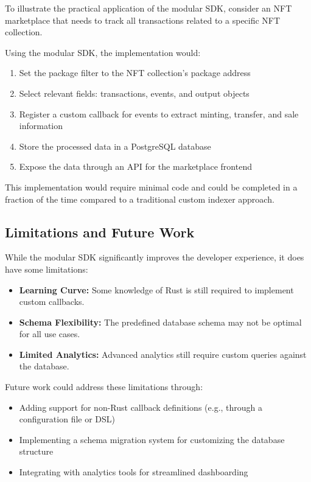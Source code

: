 To illustrate the practical application of the modular SDK, consider an NFT marketplace that needs to track all transactions related to a specific NFT collection.

Using the modular SDK, the implementation would:

\begin{enumerate}
    \item Set the package filter to the NFT collection's package address
    \item Select relevant fields: transactions, events, and output objects
    \item Register a custom callback for events to extract minting, transfer, and sale information
    \item Store the processed data in a PostgreSQL database
    \item Expose the data through an API for the marketplace frontend
\end{enumerate}

This implementation would require minimal code and could be completed in a fraction of the time compared to a traditional custom indexer approach.

\subsection{Limitations and Future Work}

While the modular SDK significantly improves the developer experience, it does have some limitations:

\begin{itemize}
    \item \textbf{Learning Curve:} Some knowledge of Rust is still required to implement custom callbacks.
    \item \textbf{Schema Flexibility:} The predefined database schema may not be optimal for all use cases.
    \item \textbf{Limited Analytics:} Advanced analytics still require custom queries against the database.
\end{itemize}

Future work could address these limitations through:

\begin{itemize}
    \item Adding support for non-Rust callback definitions (e.g., through a configuration file or DSL)
    \item Implementing a schema migration system for customizing the database structure
    \item Integrating with analytics tools for streamlined dashboarding
\end{itemize} 